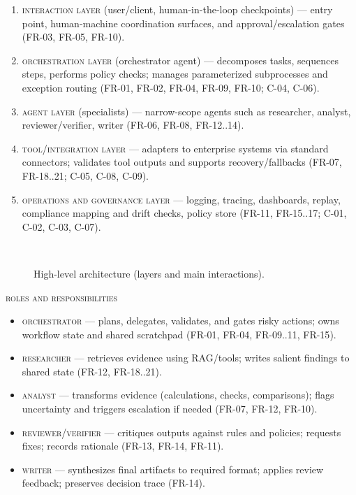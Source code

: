 \begin{enumerate}
  \item \textsc{interaction layer} (user/client, human-in-the-loop checkpoints) --- entry point, human-machine coordination surfaces, and approval/escalation gates (\textsc{FR-03, FR-05, FR-10}).
  \item \textsc{orchestration layer} (orchestrator agent) --- decomposes tasks, sequences steps, performs policy checks; manages parameterized subprocesses and exception routing (\textsc{FR-01, FR-02, FR-04, FR-09, FR-10; C-04, C-06}).
  \item \textsc{agent layer} (specialists) --- narrow-scope agents such as researcher, analyst, reviewer/verifier, writer (\textsc{FR-06, FR-08, FR-12..14}).
  \item \textsc{tool/integration layer} --- adapters to enterprise systems via standard connectors; validates tool outputs and supports recovery/fallbacks (\textsc{FR-07, FR-18..21; C-05, C-08, C-09}).
  \item \textsc{operations and governance layer} --- logging, tracing, dashboards, replay, compliance mapping and drift checks, policy store (\textsc{FR-11, FR-15..17; C-01, C-02, C-03, C-07}).
\end{enumerate}

\begin{figure}[H]
  \centering
  \caption{High-level architecture (layers and main interactions).}~\label{fig:arch-overview}
\end{figure}

\textsc{roles and responsibilities}
\begin{itemize}
  \item \textsc{orchestrator} --- plans, delegates, validates, and gates risky actions; owns workflow state and shared scratchpad (\textsc{FR-01, FR-04, FR-09..11, FR-15}).
  \item \textsc{researcher} --- retrieves evidence using RAG/tools; writes salient findings to shared state (\textsc{FR-12, FR-18..21}).
  \item \textsc{analyst} --- transforms evidence (calculations, checks, comparisons); flags uncertainty and triggers escalation if needed (\textsc{FR-07, FR-12, FR-10}).
  \item \textsc{reviewer/verifier} --- critiques outputs against rules and policies; requests fixes; records rationale (\textsc{FR-13, FR-14, FR-11}).
  \item \textsc{writer} --- synthesizes final artifacts to required format; applies review feedback; preserves decision trace (\textsc{FR-14}).
\end{itemize}

